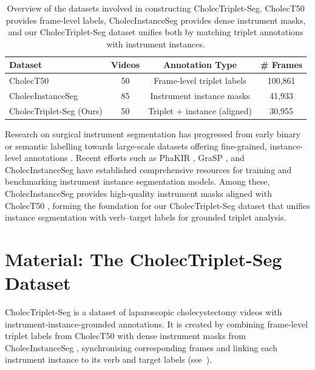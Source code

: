 \begin{table}[t]
\centering
\caption{
Overview of the datasets involved in constructing CholecTriplet-Seg. 
CholecT50 provides frame-level \ivttriplet labels, 
CholecInstanceSeg provides dense instrument masks, and our CholecTriplet-Seg dataset unifies both by matching triplet annotations with instrument instances.
}
\begin{tabular}{l|c|c|c}
\hline
Dataset & Videos & Annotation Type & \# Frames \\
\hline
CholecT50~\cite{NWOYE2022102433_rendevous} & 50 & Frame-level triplet labels  & 100,861 \\
CholecInstanceSeg~\cite{cholecinstanceseg} & 85 & Instrument instance masks  & 41,933 \\
CholecTriplet-Seg (Ours) & 50 & Triplet + instance (aligned) & 30,955 \\
\hline
\end{tabular}
\label{tab:dataset_overview}
\end{table}

Research on surgical instrument segmentation has progressed from early binary or semantic labelling towards large-scale datasets offering fine-grained, instance-level annotations \cite{ahmed2024deep}. Recent efforts such as PhaKIR \cite{rueckert2025comparative}, GraSP \cite{ayobi2024pixelwise}, and CholecInstanceSeg \cite{cholecinstanceseg} have established comprehensive resources for training and benchmarking instrument instance segmentation models. 
Among these, CholecInstanceSeg provides high-quality instrument masks aligned with CholecT50 \cite{NWOYE2022102433_rendevous}, forming the foundation for our CholecTriplet-Seg dataset that unifies instance segmentation with verb–target labels for grounded triplet analysis.



\section{Material: The CholecTriplet-Seg Dataset}\label{sec::cholectriplet_seg_dataset}
CholecTriplet-Seg is a dataset of laparoscopic cholecystectomy videos with instrument-instance-grounded \ivttriplet annotations. 
It is created by combining frame-level triplet labels from CholecT50 \cite{NWOYE2022102433_rendevous} with dense instrument masks from CholecInstanceSeg \cite{cholecinstanceseg}, synchronising corresponding frames and linking each instrument instance to its verb and target labels (see~). 

